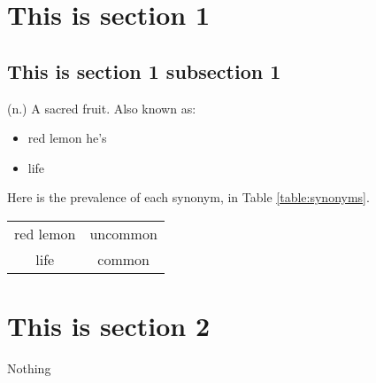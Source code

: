 

\section{This is section 1}
\subsection{This is section 1 subsection 1}

(n.) A sacred fruit. Also known as:
\begin{itemize}
    \item red lemon he's
    \item life
\end{itemize}
Here is the prevalence of each synonym, in Table \ref{table:synonyms}.
\begin{tabular}{c c}\label{table:synonyms}
    red lemon & uncommon \\ \n
    life & common
\end{tabular}

\section{This is section 2}
Nothing

